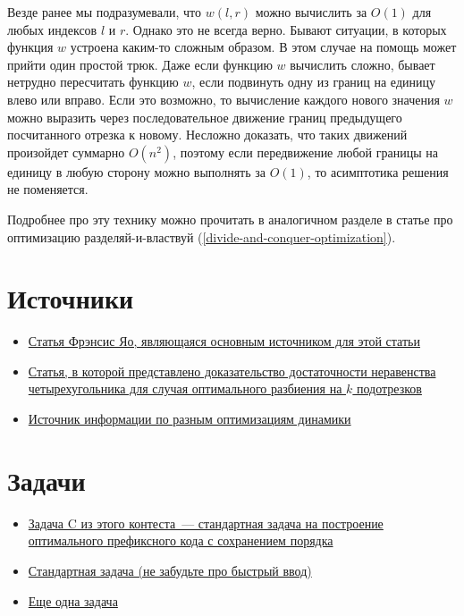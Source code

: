 Везде ранее мы подразумевали, что $w(l, r)$ можно вычислить за $O(1)$ для любых индексов $l$ и $r$. Однако это не всегда верно. Бывают ситуации, в которых функция $w$ устроена каким-то сложным образом. В этом случае на помощь может прийти один простой трюк. Даже если функцию $w$ вычислить сложно, бывает нетрудно пересчитать функцию $w$, если подвинуть одну из границ на единицу влево или вправо. Если это возможно, то вычисление каждого нового значения $w$ можно выразить через последовательное движение границ предыдущего посчитанного отрезка к новому. Несложно доказать, что таких движений произойдет суммарно $O(n^2)$, поэтому если передвижение любой границы на единицу в любую сторону можно выполнять за $O(1)$, то асимптотика решения не поменяется.

Подробнее про эту технику можно прочитать в аналогичном разделе в статье про оптимизацию разделяй-и-властвуй (\ref{divide-and-conquer-optimization}).

\section{Источники}

\begin{itemize}
    \item \href{https://cse.hkust.edu.hk/mjg_lib/bibs/DPSu/DPSu.Files/p429-yao.pdf}{Статья Фрэнсис Яо, являющаяся основным источником для этой статьи}

    \item \href{https://cse.hkust.edu.hk/mjg_lib/bibs/DPSu/DPSu.Files/sdarticle_204.pdf}{Статья, в которой представлено доказательство достаточности неравенства четырехугольника для случая оптимального разбиения на $k$ подотрезков}

    \item \href{https://codeforces.com/blog/entry/8219}{Источник информации по разным оптимизациям динамики}
\end{itemize}

\section{Задачи}

\begin{itemize}
    \item \href{https://codeforces.com/group/j9VlExDLmA/contest/100212}{Задача C из этого контеста~--- стандартная задача на построение оптимального префиксного кода с сохранением порядка}
    \item \href{https://codeforces.com/contest/321/problem/E}{Стандартная задача (не забудьте про быстрый ввод)}
    \item \href{https://www.hackerrank.com/contests/ioi-2014-practice-contest-2/challenges/guardians-lunatics-ioi14}{Еще одна задача}
\end{itemize}
